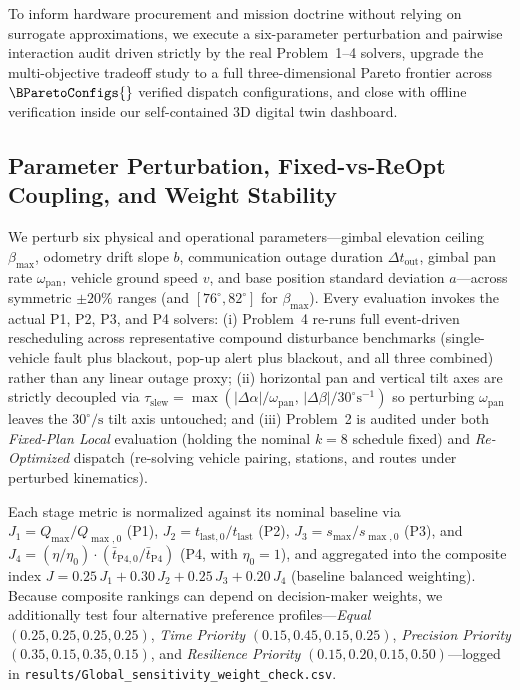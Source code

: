 To inform hardware procurement and mission doctrine without relying on surrogate approximations, we execute a six-parameter perturbation and pairwise interaction audit driven strictly by the real Problem~1--4 solvers, upgrade the multi-objective tradeoff study to a full three-dimensional Pareto frontier across $\BParetoConfigs{}$ verified dispatch configurations, and close with offline verification inside our self-contained 3D digital twin dashboard.

\subsection{Parameter Perturbation, Fixed-vs-ReOpt Coupling, and Weight Stability}
We perturb six physical and operational parameters—gimbal elevation ceiling $\beta_{\max}$, odometry drift slope $b$, communication outage duration $\Delta t_{\mathrm{out}}$, gimbal pan rate $\omega_{\mathrm{pan}}$, vehicle ground speed $v$, and base position standard deviation $a$—across symmetric $\pm 20\%$ ranges (and $[76^\circ,82^\circ]$ for $\beta_{\max}$). Every evaluation invokes the actual P1, P2, P3, and P4 solvers: (i) Problem~4 re-runs full event-driven rescheduling across representative compound disturbance benchmarks (single-vehicle fault plus blackout, pop-up alert plus blackout, and all three combined) rather than any linear outage proxy; (ii) horizontal pan and vertical tilt axes are strictly decoupled via $\tau_{\mathrm{slew}}=\max(|\Delta\alpha|/\omega_{\mathrm{pan}},\,|\Delta\beta|/30^\circ\text{s}^{-1})$ so perturbing $\omega_{\mathrm{pan}}$ leaves the $30^\circ/\text{s}$ tilt axis untouched; and (iii) Problem~2 is audited under both \emph{Fixed-Plan Local} evaluation (holding the nominal $k=8$ schedule fixed) and \emph{Re-Optimized} dispatch (re-solving vehicle pairing, stations, and routes under perturbed kinematics).

Each stage metric is normalized against its nominal baseline via $J_1=Q_{\max}/Q_{\max,0}$ (P1), $J_2=t_{\mathrm{last},0}/t_{\mathrm{last}}$ (P2), $J_3=s_{\max}/s_{\max,0}$ (P3), and $J_4=(\eta/\eta_0)\cdot(\bar{t}_{\mathrm{P4},0}/\bar{t}_{\mathrm{P4}})$ (P4, with $\eta_0=1$), and aggregated into the composite index $J = 0.25\,J_1 + 0.30\,J_2 + 0.25\,J_3 + 0.20\,J_4$ (baseline balanced weighting). Because composite rankings can depend on decision-maker weights, we additionally test four alternative preference profiles—\emph{Equal} $(0.25,0.25,0.25,0.25)$, \emph{Time Priority} $(0.15,0.45,0.15,0.25)$, \emph{Precision Priority} $(0.35,0.15,0.35,0.15)$, and \emph{Resilience Priority} $(0.15,0.20,0.15,0.50)$—logged in \texttt{results/Global\_sensitivity\_weight\_check.csv}.

